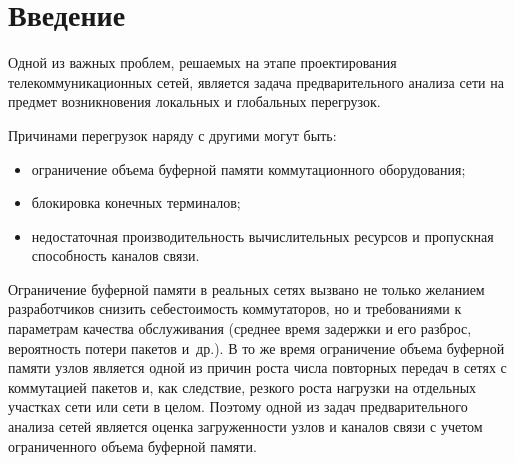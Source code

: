       \begin{multicols}{2}

      \label{st\stat}

    
      

     
\section{Введение}

     Одной из важных проблем, решаемых на этапе проектирования 
телекоммуникационных сетей, является задача предварительного анализа сети 
на предмет возникновения локальных и глобальных перегрузок.
     
     Причинами перегрузок наряду с другими могут быть:
     \begin{itemize}
     \item ограничение объема буферной памяти коммутационного 
оборудования;
     \item блокировка конечных терминалов;
     \item недостаточная производительность вычислительных ресурсов и 
пропускная способность каналов связи.
     \end{itemize}
     
     Ограничение буферной памяти в реальных сетях вызвано не только 
желанием разработчиков снизить себестоимость коммутаторов, но и 
требованиями к параметрам качества обслуживания (среднее время задержки и 
его разброс, вероятность потери пакетов и~др.). В то же время ограничение 
объема буферной памяти узлов является одной из причин роста числа 
повторных передач в сетях с коммутацией пакетов и, как следствие, резкого 
роста нагрузки на отдельных участках сети или сети в целом. Поэтому одной из 
задач предварительного анализа сетей является оценка загруженности узлов и 
каналов связи с учетом ограниченного объема буферной памяти.
     

\end{multicols}

